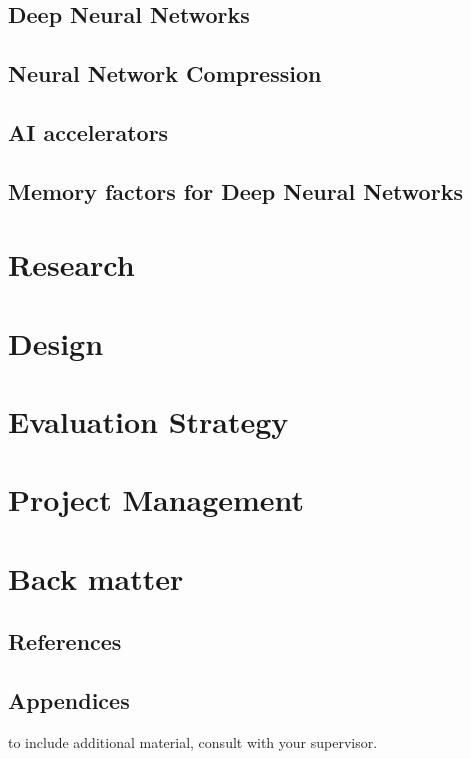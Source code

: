 \documentclass[11pt]{article}
\begin{document}
\subsection{Deep Neural Networks}\label{subsec:deepLearning}


\newpage
\subsection{Neural Network Compression}\label{subsec:compressionTypes}


\newpage
\subsection{AI accelerators}\label{subsec:AIaccelerators}


\subsection{Memory factors for Deep Neural Networks}\label{subsec:hardwareArch}


\pagebreak
\section{Research}


\pagebreak
\section{Design}


\pagebreak
\section{Evaluation Strategy}


\pagebreak
\section{Project Management}


\pagebreak
\appendix
\section{Back matter}
\subsection{References}
\printbibliography

\subsection{Appendices}
to include additional material, consult with your supervisor.

\printnoidxglossary[type=acronym]
\printacronyms
\end{document}
